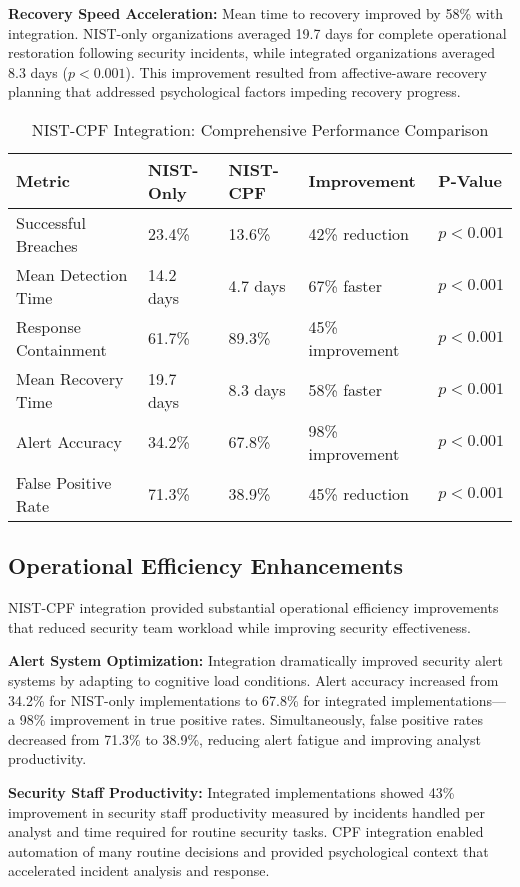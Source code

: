 \documentclass[10pt, twocolumn]{article}
\begin{document}
\textbf{Recovery Speed Acceleration:} Mean time to recovery improved by 58\% with integration. NIST-only organizations averaged 19.7 days for complete operational restoration following security incidents, while integrated organizations averaged 8.3 days ($p < 0.001$). This improvement resulted from affective-aware recovery planning that addressed psychological factors impeding recovery progress.

\begin{table*}[t]
\caption{NIST-CPF Integration: Comprehensive Performance Comparison}
\label{tab:integration_performance}
\centering
\begin{tabular}{@{}l l l l l@{}}
\toprule
\textbf{Metric} & \textbf{NIST-Only} & \textbf{NIST-CPF} & \textbf{Improvement} & \textbf{P-Value} \\
\midrule
Successful Breaches & 23.4\% & 13.6\% & 42\% reduction & $p < 0.001$ \\
Mean Detection Time & 14.2 days & 4.7 days & 67\% faster & $p < 0.001$ \\
Response Containment & 61.7\% & 89.3\% & 45\% improvement & $p < 0.001$ \\
Mean Recovery Time & 19.7 days & 8.3 days & 58\% faster & $p < 0.001$ \\
Alert Accuracy & 34.2\% & 67.8\% & 98\% improvement & $p < 0.001$ \\
False Positive Rate & 71.3\% & 38.9\% & 45\% reduction & $p < 0.001$ \\
\bottomrule
\end{tabular}
\end{table*}

\subsection{Operational Efficiency Enhancements}

NIST-CPF integration provided substantial operational efficiency improvements that reduced security team workload while improving security effectiveness.

\textbf{Alert System Optimization:} Integration dramatically improved security alert systems by adapting to cognitive load conditions. Alert accuracy increased from 34.2\% for NIST-only implementations to 67.8\% for integrated implementations—a 98\% improvement in true positive rates. Simultaneously, false positive rates decreased from 71.3\% to 38.9\%, reducing alert fatigue and improving analyst productivity.

\textbf{Security Staff Productivity:} Integrated implementations showed 43\% improvement in security staff productivity measured by incidents handled per analyst and time required for routine security tasks. CPF integration enabled automation of many routine decisions and provided psychological context that accelerated incident analysis and response.
\end{document}
